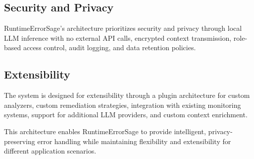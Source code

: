 \subsection{Security and Privacy}
RuntimeErrorSage's architecture prioritizes security and privacy through local LLM inference with no external API calls, encrypted context transmission, role-based access control, audit logging, and data retention policies.

\subsection{Extensibility}
The system is designed for extensibility through a plugin architecture for custom analyzers, custom remediation strategies, integration with existing monitoring systems, support for additional LLM providers, and custom context enrichment.

This architecture enables RuntimeErrorSage to provide intelligent, privacy-preserving error handling while maintaining flexibility and extensibility for different application scenarios.